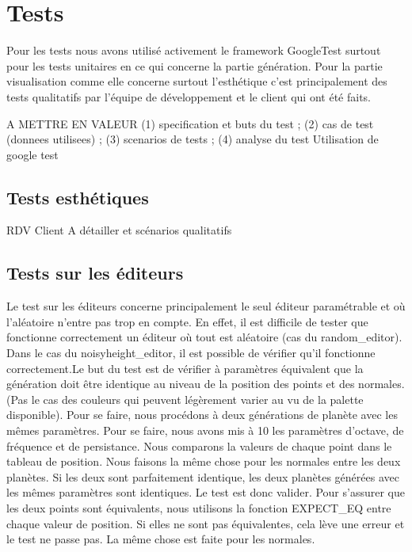 \documentclass[a4paper]{article}
\begin{document}
\newpage 
\section{Tests}

Pour les tests nous avons utilisé activement le framework GoogleTest surtout pour les tests unitaires en ce qui concerne la partie génération. 
Pour la partie visualisation comme elle concerne surtout l'esthétique c'est principalement des tests qualitatifs par l'équipe de développement et le client qui ont été faits.

 A METTRE EN VALEUR
 (1) specification et buts du test ; (2) cas de test (donnees utilisees) ; (3) scenarios de tests ; (4) analyse du test
Utilisation de google test

\subsection{Tests esthétiques}

RDV Client A détailler et scénarios qualitatifs

\subsection{Tests sur les éditeurs}

Le test sur les éditeurs concerne principalement le seul éditeur paramétrable et où l'aléatoire n'entre pas trop en compte. En effet, il est difficile de tester que fonctionne correctement un éditeur où tout est aléatoire (cas du random\_editor). Dans le cas du noisyheight\_editor, il est possible de vérifier qu'il fonctionne correctement.Le but du test est de vérifier à paramètres équivalent que la génération doit être identique au niveau de la position des points et des normales. (Pas le cas des couleurs qui peuvent légèrement varier au vu de la palette disponible). Pour se faire, nous procédons à deux générations de planète avec les mêmes paramètres. Pour se faire, nous avons mis à 10 les paramètres d'octave, de fréquence et de persistance. Nous comparons la valeurs de chaque point dans le tableau de position. Nous faisons la même chose pour les normales entre les deux planètes. Si les deux sont parfaitement identique, les deux planètes générées avec les mêmes paramètres sont identiques. Le test est donc valider. Pour s'assurer que les deux points sont équivalents, nous utilisons la fonction EXPECT\_EQ entre chaque valeur de position. Si elles ne sont pas équivalentes, cela lève une erreur et le test ne passe pas. La même chose est faite pour les normales.
\end{document}
